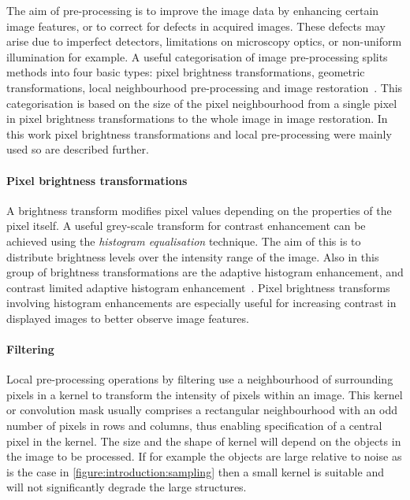 The aim of pre-processing is to improve the image data by enhancing certain image features, or to correct for defects in acquired images. These defects may arise due to imperfect detectors, limitations on microscopy optics, or non-uniform illumination for example. A useful categorisation of image pre-processing splits methods into four basic types: pixel brightness transformations, geometric transformations, local neighbourhood pre-processing and image restoration~\cite{Sonka2007}. This categorisation is based on the size of the pixel neighbourhood from a single pixel in pixel brightness transformations to the whole image in image restoration. In this work pixel brightness transformations and local pre-processing were mainly used so are described further.

\paragraph{Pixel brightness transformations} A brightness transform modifies pixel values depending on the properties of the pixel itself. A useful grey-scale transform for contrast enhancement can be achieved using the \emph{histogram equalisation} technique. The aim of this is to distribute brightness levels over the intensity range of the image. Also in this group of brightness transformations are the adaptive histogram enhancement, and contrast limited adaptive histogram enhancement~\cite{Ketcham1974}. Pixel brightness transforms involving histogram enhancements are especially useful for increasing contrast in displayed images to better observe image features.

\paragraph{Filtering} Local pre-processing operations by filtering use a neighbourhood of surrounding pixels in a kernel to transform the intensity of pixels within an image. This kernel or convolution mask usually comprises a rectangular neighbourhood with an odd number of pixels in rows and columns, thus enabling specification of a central pixel in the kernel. The size and the shape of kernel will depend on the objects in the image to be processed. If for example the objects are large relative to noise as is the case in \autoref{figure:introduction:sampling} then a small kernel is suitable and  will not significantly degrade the large structures.

